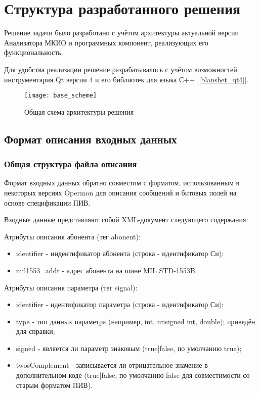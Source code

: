 \section{Структура разработанного решения}
\label{sec:struct}

Решение задачи было разработано с учётом архитектуры актуальной версии 
Анализатора МКИО и программных компонент, реализующих его функциональность.

Для удобства реализации решение разрабатывалось с учётом возможностей 
инструментария Qt версии 4 и его библиотек для языка С++ [\ref{blanshet_qt4}].

\begin{figure}[h]
\centering
\texttt{[image: base\_scheme]}
\caption{Общая схема архитектуры решения}
\label{figure:base_scheme}
\end{figure}

\subsection{Формат описания входных данных}
\label{sec:input_format}

\subsubsection{Общая структура файла описания}
Формат входных данных обратно совместим с форматом, использованным в некоторых 
версиях Opermon для описания сообщений и битовых полей на основе спецификации 
ПИВ.

Входные данные представляют собой XML-документ следующего содержания: 



Атрибуты описания абонента (тег abonent):

\begin{itemize}
 \item identifier - индентификатор абонента (строка - идентификатор Си);
 \item mil1553\_addr - адрес абонента на шине MIL STD-1553B.
\end{itemize}

Атрибуты описания параметра (тег signal):

\begin{itemize}
 \item identifier - идентификатор параметра (строка - идентификатор Си);
 \item type - тип данных параметра (например, int, unsigned int, double); 
приведён для справки;
 \item signed - является ли параметр знаковым (true|false, по умолчанию true);
 \item twosComplement - записывается ли отрицательное значение в 
дополнительном коде (true|false, по умолчанию false для совместимости со 
старым форматом ПИВ).
\end{itemize}

